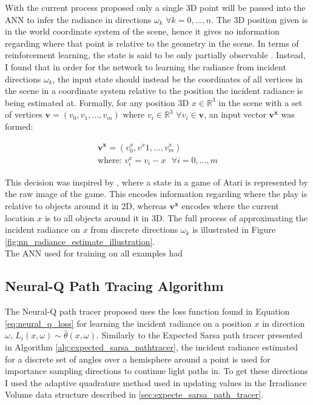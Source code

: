 \documentclass[../dissertation.tex]{subfiles}
\begin{document}
With the current process proposed only a single 3D point will be passed into the ANN to infer the radiance in directions $\omega_k$ $\forall k = 0, ..., n$. The 3D position given is in the world coordinate system of the scene, hence it gives no information regarding where that point is relative to the geometry in the scene. In terms of reinforcement learning, the state is said to be only partially observable \cite{sutton2011reinforcement}. Instead, I found that in order for the network to learning the  radiance from incident directions $\omega_k$, the input state should instead be the coordinates of all vertices in the scene in a coordinate system relative to the position the incident radiance is being estimated at. Formally, for any position 3D $x \in \mathbb{R}^3$ in the scene with a set of vertices $\mathbf{v} = (v_0, v_1, ..., v_m)$ where $v_i \in \mathbb{R}^3$ $\forall v_i \in \mathbf{v}$, an input vector $\mathbf{v^x}$ was formed:

\begin{gather*}
\mathbf{v^x} = (v^x_0, v^x1, ..., v^x_m)\\
\text{where: } v^x_i = v_i - x \ \ \ \forall i = 0, ..., m \nonumber
\end{gather*}

This decision was inspired by \cite{mnih2013playing}, where a state in a game of Atari is represented by the raw image of the game. This encodes information regarding where the play is relative to objects around it in 2D, whereas $\mathbf{v^x}$ encodes where the current location $x$ is to all objects around it in 3D. The full process of approximating the incident radiance on $x$ from discrete directions $\omega_k$ is illustrated in Figure \ref{fig:nn_radiance_estimate_illustration}.\\


The ANN used for training on all examples had 

\subsection{Neural-Q Path Tracing Algorithm}

The Neural-Q path tracer proposed uses the loss function found in Equation \ref{eq:neural_q_loss}  for learning the incident radiance on a position $x$ in direction $\omega$, $L_i(x ,\omega) \sim \hat{\theta}(x, \omega)$. Similarly to the Expected Sarsa path tracer presented in Algorithm \ref{alg:expected_sarsa_pathtracer}, the incident radiance estimated for a discrete set of angles over a hemisphere around a point is used for importance sampling directions to continue light paths in. To get these directions I used the adaptive quadrature method used in updating values in the Irradiance Volume data structure described in \ref{sec:expecte_sarsa_path_tracer}. 
\end{document}

